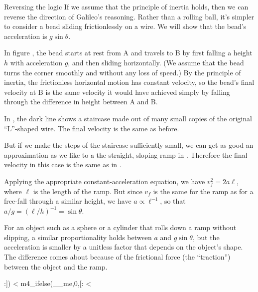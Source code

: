 \begin{eg}{Reversing the logic}\label{eg:sin-theta-proof}
If we assume that the principle of inertia holds, then we can reverse the direction of Galileo's
reasoning. Rather than a rolling ball, it's simpler to consider a bead sliding frictionlessly
on a wire. We will show that the bead's acceleration is $g\sin\theta$.

In figure , the bead starts at rest from A
and travels to B by first falling
a height $h$ with acceleration $g$, and then sliding horizontally. (We assume that the bead
turns the corner smoothly and without any loss of speed.) By the principle of inertia,
the frictionless horizontal motion has constant velocity, so the bead's final velocity at B
is the same velocity it would have achieved simply by falling through the difference in height
between A and B.

In , the dark line shows a staircase made out of many small
copies of the original ``L''-shaped wire. The final velocity is the same as before.

But if we make the steps of the staircase sufficiently small, we can get as good an
approximation as we like to a the straight, sloping ramp in .
Therefore the final velocity in this case is the same as in .

Applying the appropriate constant-acceleration equation, we have $v_f^2=2a\ell$, where
$\ell$ is the length of the ramp. But since $v_f$ is the same for the ramp as for a free-fall
through a similar height, we have $a\propto\ell^{-1}$, so that $a/g=(\ell/h)^{-1}=\sin\theta$.

For an object such as a sphere or a cylinder that rolls down a ramp without slipping, a similar proportionality holds between
$a$ and $g\sin\theta$, but the acceleration is smaller by a unitless factor that depends on the
object's shape. The difference comes about because of the frictional force (the ``traction'') between
the object and the ramp.
\end{eg}
:])
<%
m4_ifelse(__me,0,[:
<%

